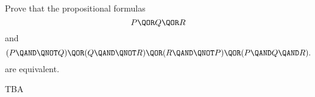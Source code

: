 \documentclass[handout]{mcs}
\begin{document}
\renewcommand{\reading}{Notes Chapters 1--3.}







\begin{problem}
Prove that the propositional formulas
\[
P \QOR Q \QOR R
\]
and
\[
(P \QAND \QNOT Q) \QOR (Q \QAND \QNOT R) \QOR (R \QAND \QNOT P) \QOR (P \QAND Q \QAND R).
\]
are equivalent.

\begin{solution}
TBA
\end{solution}
\end{problem}



\end{document}
